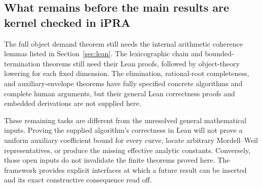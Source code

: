 \subsection{What remains before the main results are kernel checked in iPRA}

The full object demand theorem still needs the internal arithmetic
coherence lemmas listed in Section~\ref{sec:lean}. The lexicographic
chain and bounded-termination theorems still need their Lean proofs,
followed by object-theory lowering for each fixed dimension. The
elimination, rational-root completeness, and auxiliary-envelope
theorems have fully specified concrete algorithms and complete human
arguments, but their general Lean correctness proofs and embedded
 derivations are not supplied here.

These remaining tasks are different from the unresolved general
mathematical inputs. Proving the supplied algorithm's correctness in
Lean will not prove a uniform auxiliary coefficient bound for every
curve, locate arbitrary Mordell--Weil representatives, or produce the
missing effective analytic constants. Conversely, those open inputs
do not invalidate the finite theorems proved here. The framework
provides explicit interfaces at which a future result can be inserted
and its exact constructive consequence read off.

